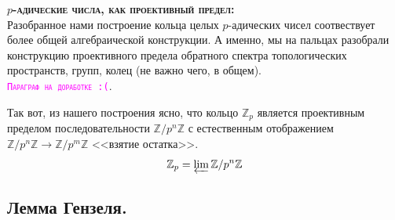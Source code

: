 \documentclass[11pt]{report}
\begin{document}
    \textbf{\textsc{$p$-адические числа, как проективный предел:}}\\
    Разобранное нами построение кольца целых $p$-адических чисел соотвествует более общей алгебраической конструкции. А именно, мы на пальцах разобрали конструкцию
    проективного предела обратного спектра топологических пространств, групп, колец (не важно чего, в общем).\\

    \textcolor{magenta}{\textsc{\texttt{Параграф на доработке :(}}}.

    Так вот, из нашего построения ясно, что кольцо $\mathbb{Z}_p$ является проективным пределом последовательности $\mathbb{Z}/p^n\mathbb{Z}$ с естественным отображением $\mathbb{Z}/p^n\mathbb{Z} \to \mathbb{Z}/p^m\mathbb{Z}$ <<взятие остатка>>.
    \[ \mathbb{Z}_p = \varprojlim \mathbb{Z}/p^n\mathbb{Z} \]
    
    \subsection{Лемма Гензеля.}
\end{document}
